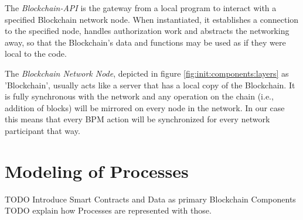 The \emph{Blockchain-API} is the gateway from a local program to interact with a specified Blockchain network node. When instantiated, it establishes a connection to the specified node, handles authorization work and abstracts the networking away, so that the Blockchain's data and functions may be used as if they were local to the code.

The \emph{Blockchain Network Node}, depicted in figure \ref{fig:init:components:layers} as 'Blockchain', usually acts like a server that has a local copy of the Blockchain. It is fully synchronous with the network and any operation on the chain (i.e., addition of blocks) will be mirrored on every node in the network. In our case this means that every BPM action will be synchronized for every network participant that way.

\section{Modeling of Processes}
\label{sec:init:model}

TODO Introduce Smart Contracts and Data as primary Blockchain Components
TODO explain how Processes are represented with those.

